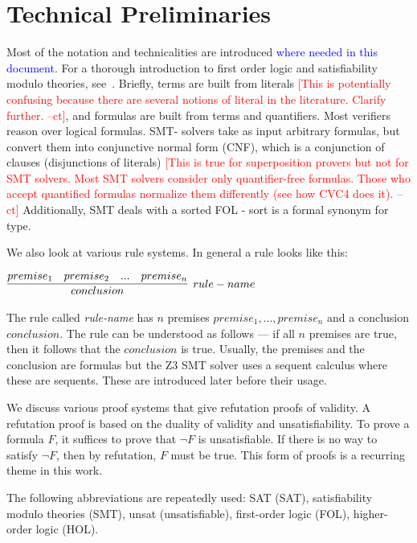 \documentclass{article}
\newcommand{\rem}[1]{\textcolor{red}{[#1]}}
\newcommand{\ed}[1]{\textcolor{blue}{#1}}
\newcommand{\ct}[1]{\rem{#1 --ct}}
\begin{document}
\section{Technical Preliminaries}
\label{sec:prelim}
	Most of the notation and technicalities are 
	introduced \ed{where needed in this document}. For a thorough introduction 
	to first order logic and satisfiability 
	modulo theories, 
	see~\cite{DBLP:reference/mc/BarrettT18}.
	Briefly, terms are built from literals
	\ct{This is potentially confusing because there are several notions of literal in the literature. Clarify further.}, 
	and formulas are built from terms and quantifiers. Most 
	verifiers reason over logical formulas. SMT-
	solvers take as input arbitrary formulas, 
	but convert them into conjunctive normal
	form (CNF), which is a conjunction 
	of clauses (disjunctions of literals)
	\ct{This is true for superposition provers but not for SMT solvers.
	Most SMT solvers consider only quantifier-free formulas.
	Those who accept quantified formulas normalize them differently
	 (see how CVC4 does it).
	}
	Additionally, SMT deals with a sorted FOL -
	sort is a formal synonym for type. 
	
	We also look at various rule systems. In 
	general a rule looks like this:
	\begin{center}
		$\infer[rule-name]{conclusion}
			{premise_1 & premise_2 & ... & premise_n}$
	\end{center}
	The rule called \textit{rule-name} has $n$ 
	premises $premise_1, ... , premise_n$ and a 
	conclusion $conclusion$. The rule can be 
	understood as follows --- if all $n$ premises 
	are true, then it follows that the $conclusion$
	is true. Usually, the premises and the conclusion 
	are formulas but the Z3 SMT solver uses a 
	sequent calculus where these are sequents. 
	These are introduced later before their usage.
	
	We discuss various proof systems that give 
	refutation proofs of validity. A refutation 
	proof is based on the duality of validity 
	and unsatisfiability. To prove a formula 
	$F$, it suffices to prove that $\neg F$ is 
	unsatisfiable. If there is no way to satisfy 
	$\neg F$, then by refutation, $F$ must be true.
	This form of proofs is a recurring theme in this 
	work.
	
	The following abbreviations are repeatedly used:
	SAT (SAT), satisfiability modulo theories (SMT),
	unsat (unsatisfiable), first-order logic (FOL), 
	higher-order logic (HOL).
	
	
\end{document}
